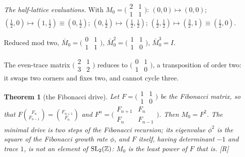 \documentclass[11pt,a4paper]{article}
\theoremstyle{plain}
\newtheorem{theorem}{Theorem}[section]
\theoremstyle{definition}
\theoremstyle{remark}
\newcommand{\rigR}{[\textup{R}]}
\begin{document}
\emph{The half-lattice evaluations.} With $M_{0}=\bigl(\begin{smallmatrix}2&1\\1&1\end{smallmatrix}\bigr)$: $(0,0)\mapsto(0,0)$; $(\tfrac12,0)\mapsto(1,\tfrac12)\equiv(0,\tfrac12)$; $(0,\tfrac12)\mapsto(\tfrac12,\tfrac12)$; $(\tfrac12,\tfrac12)\mapsto(\tfrac32,1)\equiv(\tfrac12,0)$.

Reduced mod two, $\bar M_{0}=\bigl(\begin{smallmatrix}0&1\\1&1\end{smallmatrix}\bigr)$, $\bar M_{0}^{2}=\bigl(\begin{smallmatrix}1&1\\1&0\end{smallmatrix}\bigr)$, $\bar M_{0}^{3}=I$.

The even-trace matrix $\bigl(\begin{smallmatrix}2&1\\3&2\end{smallmatrix}\bigr)$ reduces to $\bigl(\begin{smallmatrix}0&1\\1&0\end{smallmatrix}\bigr)$, a transposition of order two: it swaps two corners and fixes two, and cannot cycle three.


\begin{theorem}[the Fibonacci drive]\label{thm:fibonacci}
Let $F=\bigl(\begin{smallmatrix}1&1\\1&0\end{smallmatrix}\bigr)$ be the Fibonacci matrix, so that $F\binom{F_{n}}{F_{n-1}}=\binom{F_{n+1}}{F_{n}}$ and $F^{n}=\bigl(\begin{smallmatrix}F_{n+1}&F_{n}\\F_{n}&F_{n-1}\end{smallmatrix}\bigr)$. Then $M_{0}=F^{2}$. The minimal drive is two steps of the Fibonacci recursion; its eigenvalue $\phi^{2}$ is the square of the Fibonacci growth rate $\phi$, and $F$ itself, having determinant $-1$ and trace $1$, is not an element of $\mathrm{SL}_{2}(\mathbb{Z})$: $M_{0}$ is the least power of $F$ that is. \rigR
\end{theorem}
\end{document}

